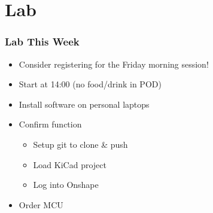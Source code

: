 \documentclass[aspectratio=169]{beamer}
\begin{document}
\section{Lab}
\begin{frame}
    \frametitle{Lab This Week}

    \begin{itemize}
        \item Consider registering for the Friday morning session!
        \item Start at 14:00 (no food/drink in POD)
        \item Install software on personal laptops
        \item Confirm function
        \begin{itemize}
            \item Setup git to clone \& push
            \item Load KiCad project
            \item Log into Onshape
        \end{itemize}
        \item Order MCU
    \end{itemize}
\end{frame}
\end{document}
